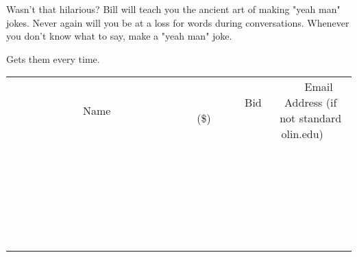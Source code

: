 \documentclass[11pt]{article}
\begin{document}
Wasn't that hilarious? Bill will teach you the ancient art of making "yeah man" jokes. Never again will you be at a loss for words during conversations. Whenever you don't know what to say, make a "yeah man" joke.

Gets them every time.
\\[6ex]
\begin{tabular}{c c c}
~~~~~~~~~~~~~Name~~~~~~~~~~~~~ & ~~~~~~~~~Bid (\$)~~~~~~~~~  & ~~~Email Address (if not standard olin.edu)~~~\\
 & & \\
\hline
 & & \\
\hline
 & & \\
\hline
 & & \\
\hline
 & & \\
\hline
 & & \\
\hline
 & & \\
\hline
 & & \\
\hline
 & & \\
\hline
 & & \\
\hline
 & & \\
\hline
 & & \\
\hline
 & & \\
\hline
 & & \\
\hline
 & & \\
\hline
 & & \\
\hline
 & & \\
\hline
 & & \\
\hline
 & & \\
\hline
 & & \\
\hline
 & & \\
\hline
 & & \\
\hline
 & & \\
\hline
 & & \\
\hline
 & & \\
\hline
 & & \\
\hline
\end{tabular}
\newpage
\end{document}
